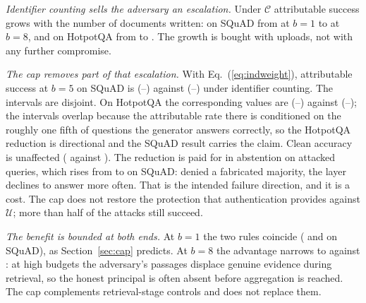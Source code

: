 \documentclass[lettersize,journal]{IEEEtran}
\newcommand{\AdvU}{\mathcal{U}}
\newcommand{\AdvC}{\mathcal{C}}
\begin{document}
\emph{Identifier counting sells the adversary an escalation.} Under $\AdvC$ attributable
success grows with the number of documents written: on SQuAD from \compromiseSignedSquadBOne{}
at $b = 1$ to \compromiseSignedSquadBEight{} at $b = 8$, and on HotpotQA from
\compromiseSignedHotpotqaBOne{} to \compromiseSignedHotpotqaBEight{}. The growth is bought with
uploads, not with any further compromise.

\emph{The cap removes part of that escalation.} With Eq.~(\ref{eq:indweight}), attributable
success at $b = 5$ on SQuAD is \compromiseSignedIndependentSquadBFive{}
(\compromiseCIFullsignedindependentSquadBFiveLow{}--\compromiseCIFullsignedindependentSquadBFiveHigh{})
against \compromiseSignedSquadBFive{}
(\compromiseCIFullsignedSquadBFiveLow{}--\compromiseCIFullsignedSquadBFiveHigh{}) under
identifier counting. The intervals are disjoint. On HotpotQA the corresponding values are
\compromiseSignedIndependentHotpotqaBFive{}
(\compromiseCIFullsignedindependentHotpotqaBFiveLow{}--\compromiseCIFullsignedindependentHotpotqaBFiveHigh{})
against \compromiseSignedHotpotqaBFive{}
(\compromiseCIFullsignedHotpotqaBFiveLow{}--\compromiseCIFullsignedHotpotqaBFiveHigh{}); the
intervals overlap because the attributable rate there is conditioned on the roughly one fifth
of questions the generator answers correctly, so the HotpotQA reduction is directional and the
SQuAD result carries the claim. Clean accuracy is unaffected
(\compromiseCleanAccSignedIndependentSquadBFive{} against
\compromiseCleanAccSignedSquadBFive{}). The reduction is paid for in abstention on attacked
queries, which rises from \compromiseAbstainSignedSquadBFive{} to
\compromiseAbstainSignedIndependentSquadBFive{} on SQuAD: denied a fabricated majority, the
layer declines to answer more often. That is the intended failure direction, and it is a cost.
The cap does not restore the protection that authentication provides against $\AdvU$; more
than half of the attacks still succeed.

\emph{The benefit is bounded at both ends.} At $b = 1$ the two rules coincide
(\compromiseSignedSquadBOne{} and \compromiseSignedIndependentSquadBOne{} on SQuAD), as
Section~\ref{sec:cap} predicts. At $b = 8$ the advantage narrows to
\compromiseSignedIndependentSquadBEight{} against \compromiseSignedSquadBEight{}: at high
budgets the adversary's passages displace genuine evidence during retrieval, so the honest
principal is often absent before aggregation is reached. The cap complements retrieval-stage
controls and does not replace them.
\end{document}
